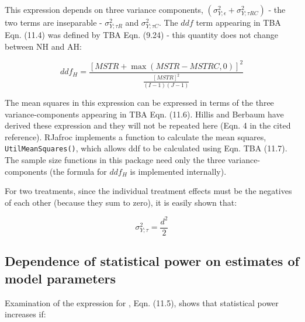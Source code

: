 \documentclass[
]{book}
\begin{document}
This expression depends on three variance components, \((\sigma_{Y;\epsilon}^2 + \sigma_{Y;\tau RC}^2)\) - the two terms are inseparable - \(\sigma_{Y;\tau R}^2\) and \(\sigma_{Y;\tau C}^2\). The \(ddf\) term appearing in TBA Eqn. (11.4) was defined by TBA Eqn. (9.24) - this quantity does not change between NH and AH:

\begin{equation}
ddf_H=\frac{\left [MSTR+\max(MSTR-MSTRC,0)  \right ]^2}{\frac{[MSTR]^2}{(I-1)(J-1)}}
\label{eq:ddfH1}
\end{equation}

The mean squares in this expression can be expressed in terms of the three variance-components appearing in TBA Eqn. (11.6). Hillis and Berbaum \citep{RN1476} have derived these expression and they will not be repeated here (Eqn. 4 in the cited reference). RJafroc implements a function to calculate the mean squares, \texttt{UtilMeanSquares()}, which allows ddf to be calculated using Eqn. TBA (11.7). The sample size functions in this package need only the three variance-components (the formula for \(ddf_H\) is implemented internally).

For two treatments, since the individual treatment effects must be the negatives of each other (because they sum to zero), it is easily shown that:

\begin{equation}
\sigma_{Y;\tau}^2=\frac{d^2}{2}
\label{eq:sigma2Tau1}
\end{equation}

\hypertarget{roc-sample-size-or-dependence-of-stats-power}{%
\subsection{Dependence of statistical power on estimates of model parameters}\label{roc-sample-size-or-dependence-of-stats-power}}

Examination of the expression for , Eqn. (11.5), shows that statistical power increases if:
\end{document}
